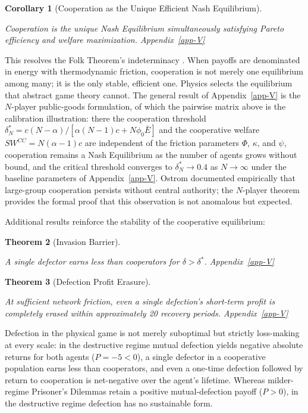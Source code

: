 \documentclass[11pt]{article}
\theoremstyle{plain}
\newtheorem{theorem}{Theorem}
\newtheorem{corollary}[theorem]{Corollary}
\theoremstyle{definition}
\theoremstyle{remark}
\begin{document}
\begin{corollary}[Cooperation as the Unique Efficient Nash Equilibrium]
\label{ethics-cor-unique-ne}

Cooperation is the unique Nash Equilibrium simultaneously satisfying Pareto efficiency and welfare maximization. Appendix~\ref{app-V}
\end{corollary}

This resolves the Folk Theorem's indeterminacy \citep{Fudenberg1986}.
When payoffs are denominated in energy with thermodynamic friction,
cooperation is not merely one equilibrium among many; it is the only
stable, efficient one. Physics selects the equilibrium that abstract
game theory cannot. The general result of Appendix~\ref{app-V} is the
\(N\)-player public-goods formulation, of which the pairwise matrix
above is the calibration illustration: there the cooperation threshold
\(\delta_N^* = c(N-\alpha)/[\alpha(N-1)c + N\phi_0\bar{E}]\) and the
cooperative welfare \(SW^{CC} = N(\alpha-1)c\) are independent of the
friction parameters \(\Phi\), \(\kappa\), and \(\psi\), cooperation
remains a Nash Equilibrium as the number of agents grows without bound,
and the critical threshold converges to \(\delta_N^* \to 0.4\) as
\(N \to \infty\) under the baseline parameters of Appendix~\ref{app-V}.
Ostrom \citep{Ostrom1990} documented empirically that large-group
cooperation persists without central authority; the \(N\)-player theorem
provides the formal proof that this observation is not anomalous but
expected.

Additional results reinforce the stability of the cooperative
equilibrium:

\begin{theorem}[Invasion Barrier]
\label{ethics-thm-invasion-barrier}

A single defector earns less than cooperators for $\delta > \delta^*$. Appendix~\ref{app-V}
\end{theorem}

\begin{theorem}[Defection Profit Erasure]
\label{ethics-thm-profit-erasure}

At sufficient network friction, even a single defection's short-term profit is completely erased within approximately 20 recovery periods. Appendix~\ref{app-V}
\end{theorem}

Defection in the physical game is not merely suboptimal but strictly
loss-making at every scale: in the destructive regime mutual defection
yields negative absolute returns for both agents (\(P = -5 < 0\)), a
single defector in a cooperative population earns less than cooperators,
and even a one-time defection followed by return to cooperation is
net-negative over the agent's lifetime. Whereas milder-regime Prisoner's
Dilemmas retain a positive mutual-defection payoff (\(P > 0\)), in the
destructive regime defection has no sustainable form.
\end{document}
